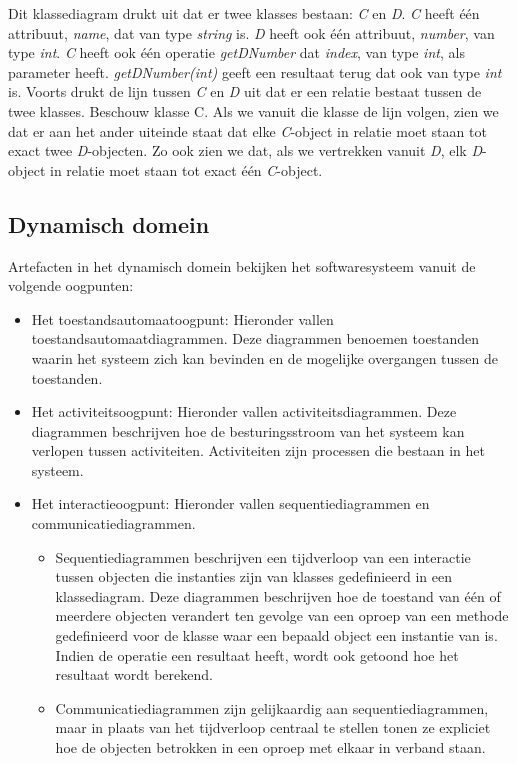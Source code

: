 Dit klassediagram drukt uit dat er twee klasses bestaan: \textit{C} en \textit{D}. \textit{C} heeft \'e\'en attribuut, \textit{name}, dat van type \textit{string} is. \textit{D} heeft ook \'e\'en attribuut, \textit{number}, van type \textit{int}. \textit{C} heeft ook \'e\'en operatie \textit{getDNumber} dat \textit{index}, van type \textit{int}, als parameter heeft. \textit{getDNumber(int)} geeft een resultaat terug dat ook van type \textit{int} is. Voorts drukt de lijn tussen \textit{C} en \textit{D} uit dat er een relatie bestaat tussen de twee klasses. Beschouw klasse C. Als we vanuit die klasse de lijn volgen, zien we dat er aan het ander uiteinde staat dat elke \textit{C}-object in relatie moet staan tot exact twee \textit{D}-objecten. Zo ook zien we dat, als we vertrekken vanuit \textit{D}, elk \textit{D}-object in relatie moet staan tot exact \'e\'en \textit{C}-object.

\subsection{Dynamisch domein}

Artefacten in het dynamisch domein bekijken het softwaresysteem vanuit de volgende oogpunten:

\begin{itemize}
	\item Het toestandsautomaatoogpunt: Hieronder vallen toestandsautomaatdiagrammen. Deze diagrammen benoemen toestanden waarin het systeem zich kan bevinden en de mogelijke overgangen tussen de toestanden.
	\item Het activiteitsoogpunt: Hieronder vallen activiteitsdiagrammen. Deze diagrammen beschrijven hoe de besturingsstroom van het systeem kan verlopen tussen activiteiten. Activiteiten zijn processen die bestaan in het systeem.
	\item Het interactieoogpunt: Hieronder vallen sequentiediagrammen en communicatiediagrammen.
	\begin{itemize}
		\item Sequentiediagrammen beschrijven een tijdverloop van een interactie tussen objecten die instanties zijn van klasses gedefinieerd in een klassediagram. Deze diagrammen beschrijven hoe de toestand van \'e\'en of meerdere objecten verandert ten gevolge van een oproep van een methode gedefinieerd voor de klasse waar een bepaald object een instantie van is. Indien de operatie een resultaat heeft, wordt ook getoond hoe het resultaat wordt berekend.
		\item Communicatiediagrammen zijn gelijkaardig aan sequentiediagrammen, maar in plaats van het tijdverloop centraal te stellen tonen ze expliciet hoe de objecten betrokken in een oproep met elkaar in verband staan. 
	\end{itemize}
\end{itemize}

